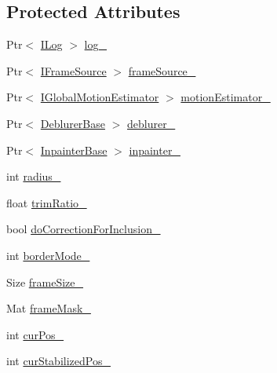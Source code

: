 \subsection*{Protected Attributes}
\begin{DoxyCompactItemize}
\item 
Ptr$<$ \hyperlink{classcv_1_1videostab_1_1ILog}{I\-Log} $>$ \hyperlink{classcv_1_1videostab_1_1StabilizerBase_a3d134bf4df68ce2a559d5d69fb187c88}{log\-\_\-}
\item 
Ptr$<$ \hyperlink{classcv_1_1videostab_1_1IFrameSource}{I\-Frame\-Source} $>$ \hyperlink{classcv_1_1videostab_1_1StabilizerBase_a7ffe51bcff9eeb916f0b153e206bf604}{frame\-Source\-\_\-}
\item 
Ptr$<$ \hyperlink{classcv_1_1videostab_1_1IGlobalMotionEstimator}{I\-Global\-Motion\-Estimator} $>$ \hyperlink{classcv_1_1videostab_1_1StabilizerBase_ac38b6ef3309fa1f95c4c8d1a2d0d517d}{motion\-Estimator\-\_\-}
\item 
Ptr$<$ \hyperlink{classcv_1_1videostab_1_1DeblurerBase}{Deblurer\-Base} $>$ \hyperlink{classcv_1_1videostab_1_1StabilizerBase_adae3e5a562d4491fc2cbc1bb1b2a6132}{deblurer\-\_\-}
\item 
Ptr$<$ \hyperlink{classcv_1_1videostab_1_1InpainterBase}{Inpainter\-Base} $>$ \hyperlink{classcv_1_1videostab_1_1StabilizerBase_aa6997fb6ae1915a8df3c0d7f58f7ed8b}{inpainter\-\_\-}
\item 
int \hyperlink{classcv_1_1videostab_1_1StabilizerBase_a9fceea8c4e22b8bbca30561d1a309e2e}{radius\-\_\-}
\item 
float \hyperlink{classcv_1_1videostab_1_1StabilizerBase_acd5ad58425a94dd6af0a29b98ee5517c}{trim\-Ratio\-\_\-}
\item 
bool \hyperlink{classcv_1_1videostab_1_1StabilizerBase_a14468697674d4710267abeaba1dfefbe}{do\-Correction\-For\-Inclusion\-\_\-}
\item 
int \hyperlink{classcv_1_1videostab_1_1StabilizerBase_aa31e13475d4e01a4e53b83838200a585}{border\-Mode\-\_\-}
\item 
Size \hyperlink{classcv_1_1videostab_1_1StabilizerBase_ac8532a295a5e7984095b44ceace4ea41}{frame\-Size\-\_\-}
\item 
Mat \hyperlink{classcv_1_1videostab_1_1StabilizerBase_a6c0c928aba126ee1e82d99854c6802c4}{frame\-Mask\-\_\-}
\item 
int \hyperlink{classcv_1_1videostab_1_1StabilizerBase_a1aad590502b048b61f749435c44e22ea}{cur\-Pos\-\_\-}
\item 
int \hyperlink{classcv_1_1videostab_1_1StabilizerBase_a0c5cefe4d769bd32a238474101e31ecf}{cur\-Stabilized\-Pos\-\_\-}

\end{DoxyCompactItemize}
